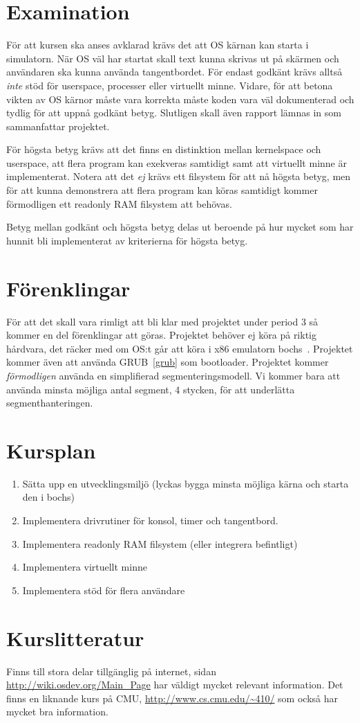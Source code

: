 \documentclass[11pt,oneside,a4paper]{article}
\begin{document}
\section{Examination}
För att kursen ska anses avklarad krävs det att OS kärnan kan starta i
simulatorn. När OS väl har startat skall text kunna skrivas ut på
skärmen och användaren ska kunna använda tangentbordet. För endast godkänt
krävs alltså \emph{inte} stöd för userspace, processer eller virtuellt minne.
Vidare, för att betona vikten av OS kärnor måste vara korrekta måste koden vara
väl dokumenterad och tydlig för att uppnå godkänt betyg.
Slutligen skall även rapport lämnas in som sammanfattar projektet.

För högsta betyg krävs att det finns en distinktion mellan kernelspace och
userspace, att flera program kan exekveras samtidigt samt att virtuellt minne är
implementerat. Notera att det \emph{ej} krävs ett filsystem för att nå högsta
betyg, men för att kunna demonstrera att flera program kan köras samtidigt
kommer förmodligen ett readonly RAM filsystem att behövas.

Betyg mellan godkänt och högsta betyg delas ut beroende på hur mycket som har
hunnit bli implementerat av kriterierna för högsta betyg.

\section{Förenklingar}
För att det skall vara rimligt att bli klar med projektet under period 3 så
kommer en del förenklingar att göras.
Projektet behöver ej köra på riktig hårdvara, det räcker med om OS:t går att
köra i x86 emulatorn bochs~\cite{bochs}. Projektet kommer även att använda
GRUB~\ref{grub} som bootloader. Projektet kommer \emph{förmodligen} använda en
simplifierad segmenteringsmodell. Vi kommer bara att använda minsta möjliga
antal segment, 4 stycken, för att underlätta segmenthanteringen.

\section{Kursplan}
\begin{enumerate}
    \item Sätta upp en utvecklingsmiljö (lyckas bygga minsta möjliga kärna och
    starta den i bochs)
    \item Implementera drivrutiner för konsol, timer och tangentbord.
    \item Implementera readonly RAM filsystem (eller integrera befintligt)
    \item Implementera virtuellt minne
    \item Implementera stöd för flera användare
\end{enumerate}

\section{Kurslitteratur}
Finns till stora delar tillgänglig på internet, sidan
\url{http://wiki.osdev.org/Main_Page} har väldigt mycket relevant information.
Det finns en liknande kurs på CMU, \url{http://www.cs.cmu.edu/~410/} som också
har mycket bra information.
\end{document}
